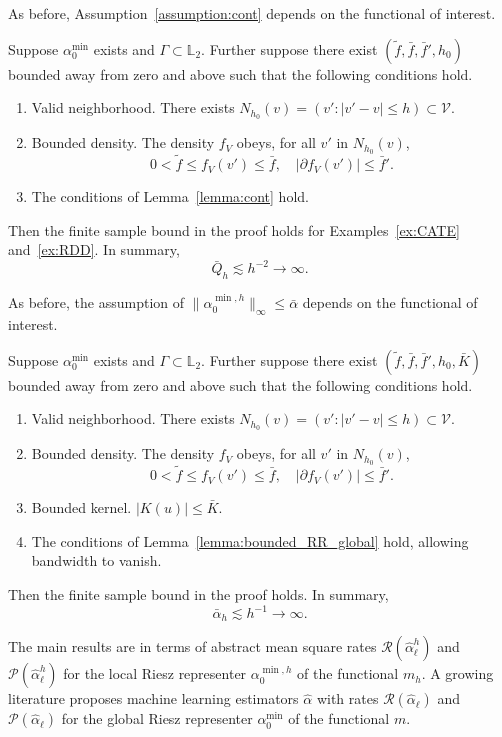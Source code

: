 As before, Assumption~\ref{assumption:cont} depends on the functional of interest.
\begin{lemma}\label{lemma:cont_local}
Suppose $\alpha_0^{\min}$ exists and $\Gamma\subset \mathbb{L}_2$. Further suppose there exist $(\tilde{f}, \bar f, \bar f', h_0)$ bounded away from zero and above such that the following conditions hold.
\begin{enumerate}
  \item Valid neighborhood. There exists $N_{h_0}(v)=(v':|v'-v|\leq h)\subset \mathcal{V}$.
    \item Bounded density. The density $f_V$ obeys, for all $v'$ in $N_{h_0}(v)$,
    $$
  0< \tilde{f} \leq f_V(v') \leq \bar f,\quad |\partial f_V(v')| \leq \bar f'.
    $$
    \item The conditions of Lemma~\ref{lemma:cont} hold.
\end{enumerate}
Then the finite sample bound in the proof holds for Examples~\ref{ex:CATE} and~\ref{ex:RDD}. In summary,
$$
\bar{Q}_h\lesssim h^{-2} \rightarrow \infty.
$$
\end{lemma}

As before, the assumption of $\|\alpha^{\min,h}_0\|_{\infty} \leq \bar{\alpha}$ depends on the functional of interest.
\begin{lemma}\label{lemma:bounded_RR_local}
Suppose $\alpha_0^{\min}$ exists and $\Gamma\subset \mathbb{L}_2$. Further suppose there exist $(\tilde{f}, \bar f, \bar f', h_0,\bar{K})$ bounded away from zero and above such that the following conditions hold.
\begin{enumerate}
  \item Valid neighborhood. There exists $N_{h_0}(v)=(v':|v'-v|\leq h)\subset \mathcal{V}$.
    \item Bounded density. The density $f_V$ obeys, for all $v'$ in $N_{h_0}(v)$,
    $$
  0< \tilde{f} \leq f_V(v') \leq \bar f,\quad |\partial f_V(v')| \leq \bar f'.
    $$
    \item Bounded kernel. $|K(u)|\leq \bar{K}$.
    \item The conditions of Lemma~\ref{lemma:bounded_RR_global} hold, allowing bandwidth to vanish.
\end{enumerate}
Then the finite sample bound in the proof holds. In summary,
$$
\bar{\alpha}_h\lesssim h^{-1}\rightarrow \infty.
$$
\end{lemma}

The main results are in terms of abstract mean square rates $\mathcal{R}(\hat{\alpha}^h_{\ell})$ and $\mathcal{P}(\hat{\alpha}^h_{\ell})$ for the local Riesz representer $\alpha_0^{\min,h}$ of the functional $m_h$. A growing literature proposes machine learning estimators $\hat{\alpha}$ with rates $\mathcal{R}(\hat{\alpha}_{\ell})$ and $\mathcal{P}(\hat{\alpha}_{\ell})$ for the global Riesz representer $\alpha^{\min}_0$ of the functional $m$.

